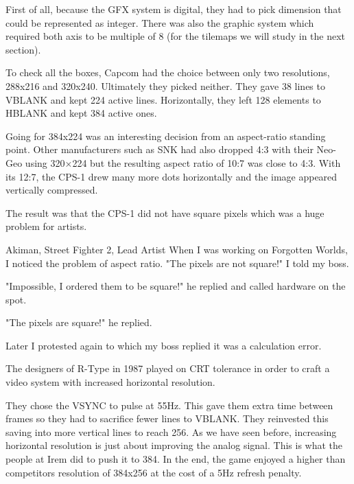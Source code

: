 First of all, because the GFX system is digital, they had to pick dimension that could be represented as integer. There was also the graphic system which required both axis to be multiple of 8 (for the tilemaps we will study in the next section).

To check all the boxes, Capcom had the choice between only two resolutions, 288x216 and 320x240. Ultimately they picked neither. They gave 38 lines to VBLANK and kept 224 active lines\cite{petitCRT}. Horizontally, they left 128 elements to HBLANK and kept 384 active ones.  

Going for 384x224 was an interesting decision from an aspect-ratio standing point. Other manufacturers such as SNK had also dropped 4:3 with their Neo-Geo using 320×224 but the resulting aspect ratio of 10:7 was close to 4:3. With its 12:7, the CPS-1 drew many more dots horizontally and the image appeared vertically compressed. 




The result was that the CPS-1 did not have square pixels which was a huge problem for artists.  

\begin{q}{Akiman, Street Fighter 2, Lead Artist\cite{akiman}}
When I was working on Forgotten Worlds, I noticed the problem of aspect ratio. "The pixels are not square!" I told my boss.

"Impossible, I ordered them to be square!" he replied and called hardware on the spot.

"The pixels are square!" he replied. 

Later I protested again to which my boss replied it was a calculation error.
\end{q}


\begin{trivia}
The designers of R-Type in 1987 played on CRT tolerance in order to craft a video system with increased horizontal resolution. 

They chose the VSYNC to pulse at 55Hz. This gave them extra time between frames so they had to sacrifice fewer lines to VBLANK. They reinvested this saving into more vertical lines to reach 256. As we have seen before, increasing horizontal resolution is just about improving the analog signal. This is what the people at Irem did to push it to 384. In the end, the game enjoyed a higher than competitors resolution of 384x256 at the cost of a 5Hz refresh penalty.
\end{trivia}



